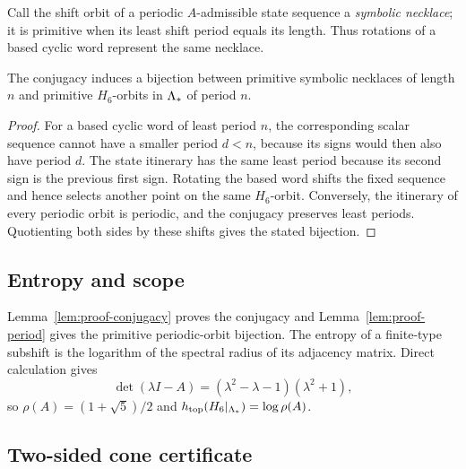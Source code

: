 Call the shift orbit of a periodic $A$-admissible state sequence a
\emph{symbolic necklace}; it is primitive when its least shift period equals
its length.  Thus rotations of a based cyclic word represent the same
necklace.

\begin{lemma}
\label{lem:proof-period}
The conjugacy induces a bijection between primitive symbolic necklaces of
length $n$ and primitive $H_6$-orbits in $\Lambda_*$ of period $n$.
\end{lemma}

\begin{proof}
For a based cyclic word of least period $n$, the corresponding scalar sequence
cannot have a smaller period $d<n$, because its signs would then also have
period $d$.  The state itinerary has the same least period because its second
sign is the previous first sign.  Rotating the based word shifts the fixed
sequence and hence selects another point on the same $H_6$-orbit.  Conversely,
the itinerary of every periodic orbit is periodic, and the conjugacy preserves
least periods.  Quotienting both sides by these shifts gives the stated
bijection.
\end{proof}

\subsection{Entropy and scope}

Lemma~\ref{lem:proof-conjugacy} proves the conjugacy and
Lemma~\ref{lem:proof-period} gives the primitive periodic-orbit bijection.  The
entropy of a finite-type subshift is the logarithm of the spectral radius of
its adjacency matrix.  Direct calculation gives
\[
 \det(\lambda I-A)=(\lambda^2-\lambda-1)(\lambda^2+1),
\]
so $\rho(A)=(1+\sqrt5)/2$ and
$h_{\rm top}(H_6|_{\Lambda_*})=\log\rho(A)$.

\subsection{Two-sided cone certificate}

